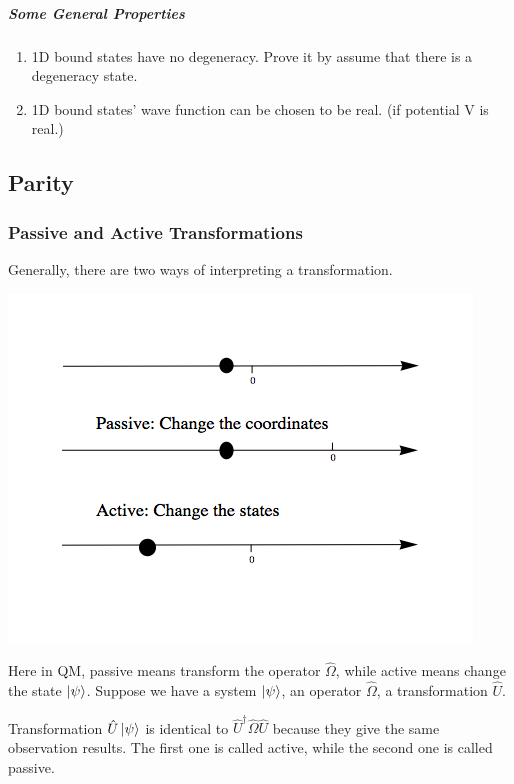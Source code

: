 \documentclass[letterpaper,10pt,english]{sphinxmanual}
\begin{document}
\subparagraph{Some General Properties}
\label{QuantumMechanics:some-general-properties}\begin{enumerate}
\item {} 
1D bound states have no degeneracy.
Prove it by assume that there is a degeneracy state.

\item {} 
1D bound states' wave function can be chosen to be real. (if potential V is real.)

\end{enumerate}


\subsection{Parity}
\label{QuantumMechanics:parity}

\subsubsection{Passive and Active Transformations}
\label{QuantumMechanics:passive-and-active-transformations}
Generally, there are two ways of interpreting a transformation.

\includegraphics{transformations.png}

Here in QM, passive means transform the operator $\hat \Omega$, while active means change the state $\ket{\psi}$. Suppose we have a system $\ket{\psi}$, an operator $\hat \Omega$, a transformation $\hat U$.

Transformation $\hat U \ket{\psi}$ is identical to $\hat U^\dagger \hat \Omega \hat U$ because they give the same observation results. The first one is called active, while the second one is called passive.
\end{document}
